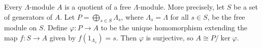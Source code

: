 Every $\Lambda$-module $A$ is a quotient of a free $\Lambda$-module. More precisely, let $S$ be a set of generators of $A$. Let $P = \bigoplus_{s \in S} \Lambda_s$, where $\Lambda_s = \Lambda$ for all $s \in S$, be the free module on $S$. Define $\varphi : P \rightarrow A$ to be the unique homomorphism extending the map $f : S \rightarrow A$ given by $f(1_{\Lambda_s}) = s$. Then $\varphi$ is surjective, so $A \cong P / \ker \varphi$.
